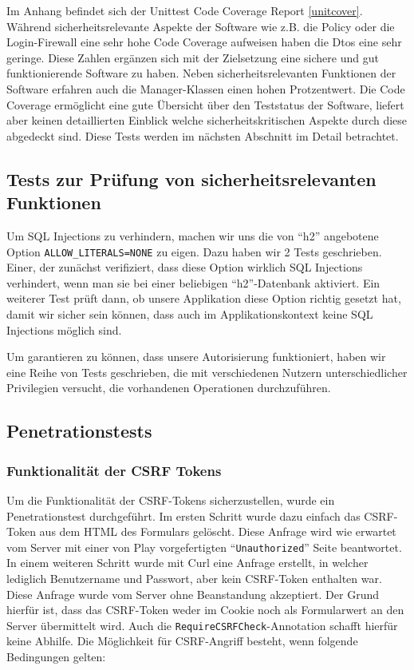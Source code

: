 \documentclass[12pt,DIV14,BCOR10mm,a4paper,parskip=half-,headsepline,headinclude,english,ngerman,bibliography=totocnumbered]{scrreprt}
\begin{document}
Im Anhang befindet sich der Unittest Code Coverage Report \ref{unitcover}. Während sicherheitsrelevante Aspekte der Software wie z.B. die Policy oder die Login-Firewall eine sehr hohe Code Coverage aufweisen haben die Dtos eine sehr geringe. Diese Zahlen ergänzen sich mit der Zielsetzung eine sichere und gut funktionierende Software zu haben. Neben sicherheitsrelevanten Funktionen der Software erfahren auch die Manager-Klassen einen hohen Protzentwert. Die Code Coverage ermöglicht eine gute Übersicht über den Teststatus der Software, liefert aber keinen detaillierten Einblick welche sicherheitskritischen Aspekte durch diese abgedeckt sind. Diese Tests werden im nächsten Abschnitt im Detail betrachtet.

\subsection{Tests zur Prüfung von sicherheitsrelevanten Funktionen}

Um SQL Injections zu verhindern, machen wir uns die von \enquote{h2} angebotene Option \texttt{ALLOW\_LITERALS=NONE} zu eigen.
Dazu haben wir 2 Tests geschrieben.
Einer, der zunächst verifiziert, dass diese Option wirklich SQL Injections verhindert, wenn man sie bei einer beliebigen \enquote{h2}-Datenbank aktiviert.
Ein weiterer Test prüft dann, ob unsere Applikation diese Option richtig gesetzt hat, damit wir sicher sein können, dass auch im Applikationskontext keine SQL Injections möglich sind.

Um garantieren zu können, dass unsere Autorisierung funktioniert, haben wir eine Reihe von Tests geschrieben, die mit verschiedenen Nutzern unterschiedlicher Privilegien versucht, die vorhandenen Operationen durchzuführen.

\subsection{Penetrationstests}

\subsubsection{Funktionalität der CSRF Tokens}
Um die Funktionalität der CSRF-Tokens sicherzustellen, wurde ein Penetrationstest durchgeführt. Im ersten Schritt wurde dazu einfach das CSRF-Token aus dem HTML des Formulars gelöscht. Diese Anfrage wird wie erwartet vom Server mit einer von Play vorgefertigten \enquote{\texttt{Unauthorized}} Seite beantwortet. In einem weiteren Schritt wurde mit Curl eine Anfrage erstellt, in welcher lediglich Benutzername und Passwort, aber kein CSRF-Token enthalten war. Diese Anfrage wurde vom Server ohne Beanstandung akzeptiert. Der Grund hierfür ist, dass das CSRF-Token weder im Cookie noch als Formularwert an den Server übermittelt wird. Auch die \texttt{RequireCSRFCheck}-Annotation schafft hierfür keine Abhilfe. Die Möglichkeit für CSRF-Angriff besteht, wenn folgende Bedingungen gelten:
\end{document}
